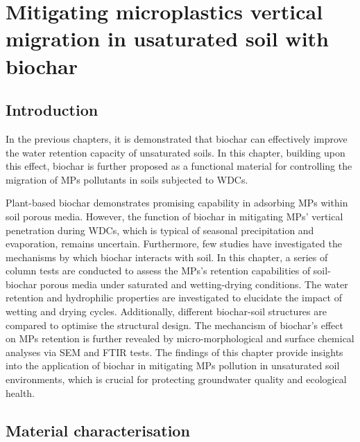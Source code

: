 \chapter{Mitigating microplastics vertical migration in usaturated soil with biochar}
\label{chap:five}

\section{Introduction} \label{sec:5.1}
In the previous chapters, it is demonstrated that biochar can effectively improve the water retention capacity of unsaturated soils. In this chapter, building upon this effect, biochar is further proposed as a functional material for controlling the migration of \ac{MPs} pollutants in soils subjected to \acp{WDC}. \par
Plant-based biochar demonstrates promising capability in adsorbing \ac{MPs} within soil porous media. However, the function of biochar in mitigating MPs’ vertical penetration during \acp{WDC}, which is typical of seasonal precipitation and evaporation, remains uncertain. Furthermore, few studies have investigated the mechanisms by which biochar interacts with soil. In this chapter, a series of column tests are conducted to assess the \ac{MPs}'s retention capabilities of soil-biochar porous media under saturated and wetting-drying conditions. The water retention and hydrophilic properties are investigated to elucidate the impact of wetting and drying cycles. Additionally, different biochar-soil structures are compared to optimise the structural design. The mechancism of biochar's effect on \ac{MPs} retention is further revealed by micro-morphological and surface chemical analyses via SEM and FTIR tests. The findings of this chapter provide insights into the application of biochar in mitigating \ac{MPs} pollution in unsaturated soil environments, which is crucial for protecting groundwater quality and ecological health. \par

\section{Material characterisation} \label{sec:5.2}
